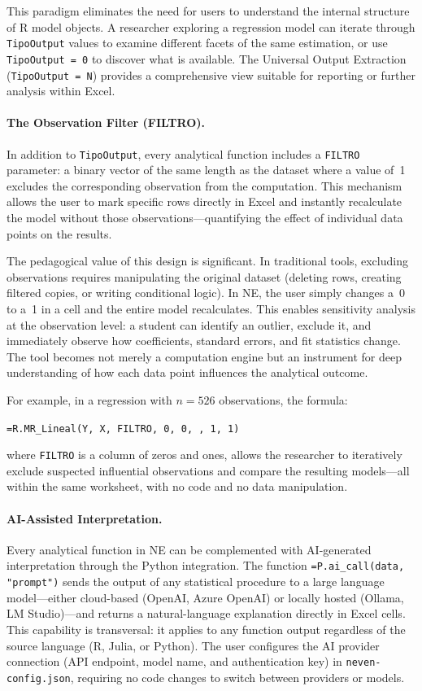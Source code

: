 \documentclass[preprint,12pt,authoryear]{elsarticle}
\newcommand{\neven}{NE\raisebox{0.2ex}{v}\rotatebox[origin=c]{180}{E}\rotatebox[origin=c]{180}{N}}
\begin{document}
This paradigm eliminates the need for users to understand the internal structure of R model objects. A researcher exploring a regression model can iterate through \texttt{TipoOutput} values to examine different facets of the same estimation, or use \texttt{TipoOutput = 0} to discover what is available. The Universal Output Extraction (\texttt{TipoOutput = N}) provides a comprehensive view suitable for reporting or further analysis within Excel.

\paragraph{The Observation Filter (FILTRO).}
In addition to \texttt{TipoOutput}, every analytical function includes a \texttt{FILTRO} parameter: a binary vector of the same length as the dataset where a value of~1 excludes the corresponding observation from the computation. This mechanism allows the user to mark specific rows directly in Excel and instantly recalculate the model without those observations---quantifying the effect of individual data points on the results.

The pedagogical value of this design is significant. In traditional tools, excluding observations requires manipulating the original dataset (deleting rows, creating filtered copies, or writing conditional logic). In \neven{}, the user simply changes a~0 to a~1 in a cell and the entire model recalculates. This enables sensitivity analysis at the observation level: a student can identify an outlier, exclude it, and immediately observe how coefficients, standard errors, and fit statistics change. The tool becomes not merely a computation engine but an instrument for deep understanding of how each data point influences the analytical outcome.

For example, in a regression with $n = 526$ observations, the formula:
\begin{center}
\texttt{=R.MR\_Lineal(Y, X, FILTRO, 0, 0, , 1, 1)}
\end{center}
where \texttt{FILTRO} is a column of zeros and ones, allows the researcher to iteratively exclude suspected influential observations and compare the resulting models---all within the same worksheet, with no code and no data manipulation.

\paragraph{AI-Assisted Interpretation.}
Every analytical function in \neven{} can be complemented with AI-generated interpretation through the Python integration. The function \texttt{=P.ai\_call(data, "prompt")} sends the output of any statistical procedure to a large language model---either cloud-based (OpenAI, Azure OpenAI) or locally hosted (Ollama, LM Studio)---and returns a natural-language explanation directly in Excel cells. This capability is transversal: it applies to any function output regardless of the source language (R, Julia, or Python). The user configures the AI provider connection (API endpoint, model name, and authentication key) in \texttt{neven-config.json}, requiring no code changes to switch between providers or models.
\end{document}
